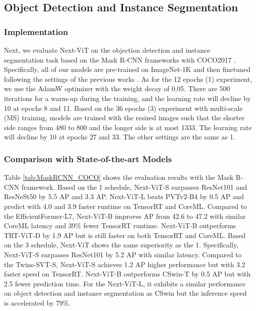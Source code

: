 \documentclass[10pt,twocolumn,letterpaper]{article}
\begin{document}
\subsection{Object Detection and Instance Segmentation}
\subsubsection{Implementation} 
Next, we evaluate Next-ViT on the objection detection and instance segmentation task \cite{COCO} based on the Mask R-CNN \cite{Mask_RCNN} frameworks with COCO2017 \cite{COCO}.
Specifically, all of our models are pre-trained on ImageNet-1K and then finetuned following the settings of the previous works \cite{PVT_v1,Swin,Twins}.
As for the 12 epochs (1) experiment, we use the AdamW optimizer with the weight decay of 0.05. There are 500 iterations for a warm-up during the training, and the learning rate will decline by 10 at epochs 8 and 11. Based on the 36 epochs (3) experiment with multi-scale (MS) training, models are trained with the resized images such that the shorter side ranges from 480 to 800 and the longer side is at most 1333. The learning rate will decline by 10 at epochs 27 and 33. The other settings are the same as 1.


\subsubsection{Comparison with State-of-the-art Models} 
Table \ref{tab:MaskRCNN_COCO} shows the evaluation results with the Mask R-CNN framework. Based on the 1 schedule, Next-ViT-S surpasses ResNet101\cite{ResNet} and ResNeSt50\cite{zhang2022resnest} by 5.5 AP and 3.3 AP. Next-ViT-L beats PVTv2-B4\cite{PVT_v2} by 0.5 AP and predict with 4.0 and 3.9 faster runtime on TensorRT and CoreML. Compared to the EfficientFormer-L7\cite{li2022efficientformer}, Next-ViT-B improves AP from 42.6 to 47.2 with similar CoreML latency and 39\% fewer TensorRT runtime. Next-ViT-B outperforms TRT-ViT-D\cite{xia2022trt} by 1.9 AP  but is still faster on both TensorRT and CoreML.
Based on the 3 schedule, Next-ViT shows the same superiority as the 1. Specifically, Next-ViT-S surpasses ResNet101 by 5.2 AP with similar latency. Compared to the Twins-SVT-S, Next-ViT-S achieves 1.2 AP higher performance but with 3.2 faster speed on TensorRT. Next-ViT-B outperforms CSwin-T by 0.5 AP but with 2.5 fewer prediction time.  For the Next-ViT-L, it exhibits a similar performance on object detection and instance segmentation as CSwin \cite{CSWin} but the inference speed is accelerated by 79\%.
\end{document}
